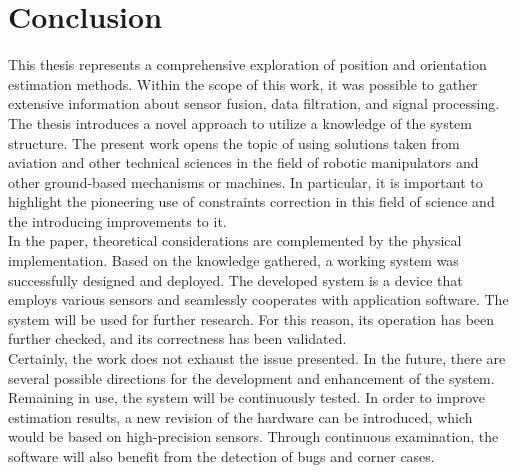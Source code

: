 \chapter{Conclusion}

This thesis represents a comprehensive exploration of position and orientation estimation methods. Within the scope of this work, it was possible to gather extensive information about sensor fusion, data filtration, and signal processing. The thesis introduces a novel approach to utilize a knowledge of the system structure. The present work opens the topic of using solutions taken from aviation and other technical sciences in the field of robotic manipulators and other ground-based mechanisms or machines. In particular, it is important to highlight the pioneering use of constraints correction in this field of science and the introducing improvements to it.\\

In the paper, theoretical considerations are complemented by the physical implementation. Based on the knowledge gathered, a working system was successfully designed and deployed. The developed system is a device that employs various sensors and seamlessly cooperates with application software. The system will be used for further research. For this reason, its operation has been further checked, and its correctness has been validated.\\

Certainly, the work does not exhaust the issue presented. In the future, there are several possible directions for the development and enhancement of the system. Remaining in use, the system will be continuously tested. In order to improve estimation results, a new revision of the hardware can be introduced, which would be based on high-precision sensors. Through continuous examination, the software will also benefit from the detection of bugs and corner cases.




